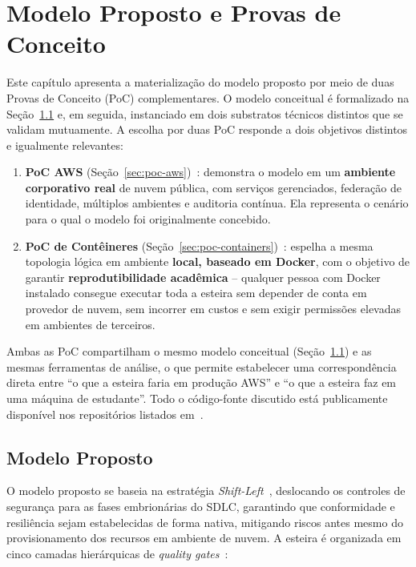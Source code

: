 \chapter{Modelo Proposto e Provas de Conceito}

Este capítulo apresenta a materialização do modelo proposto por meio de duas Provas de Conceito (PoC) complementares. O modelo conceitual é formalizado na Seção~\ref{sec:modelo} e, em seguida, instanciado em dois substratos técnicos distintos que se validam mutuamente. A escolha por duas PoC responde a dois objetivos distintos e igualmente relevantes:

\begin{enumerate}
    \item \textbf{PoC AWS} (Seção~\ref{sec:poc-aws})~: demonstra o modelo em um \textbf{ambiente corporativo real} de nuvem pública, com serviços gerenciados, federação de identidade, múltiplos ambientes e auditoria contínua. Ela representa o cenário para o qual o modelo foi originalmente concebido.
    \item \textbf{PoC de Contêineres} (Seção~\ref{sec:poc-containers})~: espelha a mesma topologia lógica em ambiente \textbf{local, baseado em Docker}, com o objetivo de garantir \textbf{reprodutibilidade acadêmica} -- qualquer pessoa com Docker instalado consegue executar toda a esteira sem depender de conta em provedor de nuvem, sem incorrer em custos e sem exigir permissões elevadas em ambientes de terceiros.
\end{enumerate}

Ambas as PoC compartilham o mesmo modelo conceitual (Seção~\ref{sec:modelo}) e as mesmas ferramentas de análise, o que permite estabelecer uma correspondência direta entre ``o que a esteira faria em produção AWS'' e ``o que a esteira faz em uma máquina de estudante''. Todo o código-fonte discutido está publicamente disponível nos repositórios listados em~.

\section{Modelo Proposto}
\label{sec:modelo}

O modelo proposto se baseia na estratégia \textit{Shift-Left}~, deslocando os controles de segurança para as fases embrionárias do SDLC, garantindo que conformidade e resiliência sejam estabelecidas de forma nativa, mitigando riscos antes mesmo do provisionamento dos recursos em ambiente de nuvem. A esteira é organizada em cinco camadas hierárquicas de \textit{quality gates}~:

